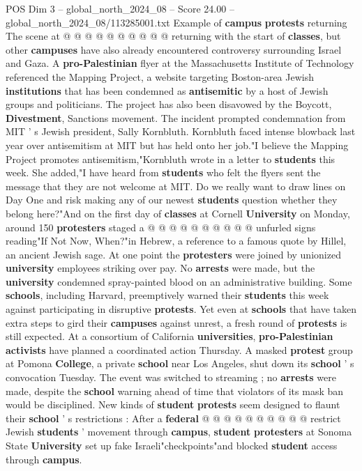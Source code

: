 \begin{textsample}{POS Dim 3 – global\_north\_2024\_08 – Score 24.00 – global\_north\_2024\_08/113285001.txt}
Example of \textbf{campus} \textbf{protests} returning The scene at @ @ @ @ @ @ @ @ @ @ returning with the start of \textbf{classes}, but other \textbf{campuses} have also already encountered controversy surrounding Israel and Gaza.
A \textbf{pro-Palestinian} flyer at the Massachusetts Institute of Technology referenced the Mapping Project, a website targeting Boston-area Jewish \textbf{institutions} that has been condemned as \textbf{antisemitic} by a host of Jewish groups and politicians.
The project has also been disavowed by the Boycott, \textbf{Divestment}, Sanctions movement.
The incident prompted condemnation from MIT ' s Jewish president, Sally Kornbluth.
Kornbluth faced intense blowback last year over antisemitism at MIT but has held onto her job."I believe the Mapping Project promotes antisemitism,"Kornbluth wrote in a letter to \textbf{students} this week.
She added,"I have heard from \textbf{students} who felt the flyers sent the message that they are not welcome at MIT.
Do we really want to draw lines on Day One and risk making any of our newest \textbf{students} question whether they belong here?"And on the first day of \textbf{classes} at Cornell \textbf{University} on Monday, around 150 \textbf{protesters} staged a @ @ @ @ @ @ @ @ @ @ unfurled signs reading"If Not Now, When?"in Hebrew, a reference to a famous quote by Hillel, an ancient Jewish sage.
At one point the \textbf{protesters} were joined by unionized \textbf{university} employees striking over pay.
No \textbf{arrests} were made, but the \textbf{university} condemned spray-painted blood on an administrative building.
Some \textbf{schools}, including Harvard, preemptively warned their \textbf{students} this week against participating in disruptive \textbf{protests}.
Yet even at \textbf{schools} that have taken extra steps to gird their \textbf{campuses} against unrest, a fresh round of \textbf{protests} is still expected.
At a consortium of California \textbf{universities}, \textbf{pro-Palestinian} \textbf{activists} have planned a coordinated action Thursday.
A masked \textbf{protest} group at Pomona \textbf{College}, a private \textbf{school} near Los Angeles, shut down its \textbf{school} ' s convocation Tuesday.
The event was switched to streaming ; no \textbf{arrests} were made, despite the \textbf{school} warning ahead of time that violators of its mask ban would be disciplined.
New kinds of \textbf{student} \textbf{protests} seem designed to flaunt their \textbf{school} ' s restrictions : After a \textbf{federal} @ @ @ @ @ @ @ @ @ @ restrict Jewish \textbf{students} ' movement through \textbf{campus}, \textbf{student} \textbf{protesters} at Sonoma State \textbf{University} set up fake Israeli"checkpoints"and blocked \textbf{student} access through \textbf{campus}.

\end{textsample}
